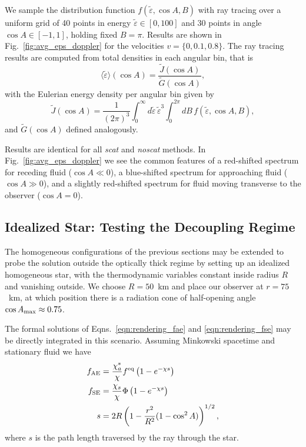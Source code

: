 \documentclass[aps,floatfix,prd,superscriptaddress,twocolumn]{revtex4-1}
\newcommand{\todo}[1]{\marginpar{\tiny{\textcolor{red}{#1}}}}
\renewcommand\todo[1]{} %
\begin{document}
We sample the distribution function $f(\tilde{\varepsilon},\cos A,B)$
with ray tracing
over a uniform grid of 40 points in energy $\tilde{\varepsilon}\in[0,100]$
and 30 points in angle $\cos A\in[-1,1]$, holding fixed $B=\pi$.
Results are shown in Fig.~\ref{fig:avg_eps_doppler} for
the velocities $v=\{0,0.1,0.8\}$.
The ray tracing results are computed from total densities in each angular bin,
that is
\begin{equation}
  \label{eqn:avg_eps_per_cosA}
  \langle \tilde{\varepsilon} \rangle (\cos A) =
  \frac{\tilde{J}(\cos A)}{\tilde{G}(\cos A)},
\end{equation}
with the Eulerian energy density per angular bin given by
\begin{equation}
  \label{eqn:J_per_cosA}
  \tilde{J}(\cos A) =
  \frac{1}{(2\pi)^3} \int_0^{\infty} d\tilde{\varepsilon} \, \tilde{\varepsilon}^3
  \int_0^{2\pi} dB \, f(\tilde{\varepsilon},\cos A,B),
\end{equation}
and $\tilde{G}(\cos A)$ defined analogously.
\todo{add metric terms for these integrals}
Results are identical for all \emph{scat} and \emph{noscat} methods.
In Fig.~\ref{fig:avg_eps_doppler}
we see the common features of a red-shifted spectrum for receding fluid
($\cos A\ll0$),
a blue-shifted spectrum for approaching fluid
($\cos A\gg0$),
and a slightly red-shifted spectrum for fluid moving transverse to the
observer ($\cos A=0$).

\subsection{Idealized Star:
  Testing the Decoupling Regime}
\label{ssec:test_ab_star}
The homogeneous configurations of the previous sections may be extended to
probe the solution outside the optically thick regime
by setting up an idealized homogeneous star, with the thermodynamic variables
constant inside radius $R$ and vanishing outside.
We choose $R=50$~km and place our observer at $r=75$~km,
at which position there is a radiation cone of half-opening angle
$\cos A_{\rm max}\approx0.75$.

The formal solutions of
Eqns.~\ref{eqn:rendering_fae} and \ref{eqn:rendering_fse}
may be directly integrated in this scenario. Assuming Minkowski spacetime
and stationary fluid we have
\begin{align}
  \label{eqn:fae_homogeneous_general}
  f_{\rm AE} &=
  \frac{\chi_a^{*}}{\chi} f^{\rm eq} \left(1-e^{-\chi s}\right) \\
  \label{eqn:fse_homogeneous_general}
  f_{\rm SE} &=
  \frac{\chi_s}{\chi} \Phi \left(1-e^{-\chi s}\right) \\
  \label{eqn:geometric_s}
  s &= 2 R \left(1-\frac{r^2}{R^2}(1-\cos^2 A)\right)^{1/2},
\end{align}
where $s$ is the path length traversed by the ray through the star.
\end{document}
